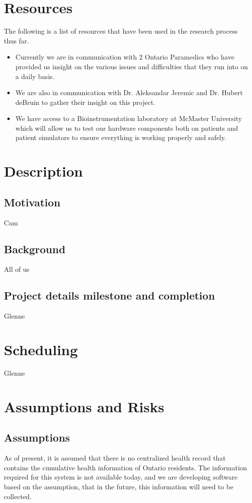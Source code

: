 \documentclass{article}
\begin{document}
\section{Resources}
The following is a list of resources that have been used in the research process thus far.
\begin{itemize}
\item Currently we are in communication with 2 Ontario Paramedics who have provided us insight on the various issues and difficulties that they run into on a daily basis.
\item We are also in communication with Dr. Aleksandar Jeremic and Dr. Hubert deBruin to gather their insight on this project.
\item We have access to a Bioinstrumentation laboratory at McMaster University which will allow us to test our hardware components both on patients and patient simulators to ensure everything is working properly and safely.
\end{itemize}



\section{Description}

\subsection{Motivation}
Cam
\subsection{Background}
All of us
\subsection{Project details milestone and completion}
Glenne
\section{Scheduling}
Glenne
\section{Assumptions and Risks}

\subsection{Assumptions}

As of present, it is assumed that there is no centralized health record that contains the cumulative health information of Ontario residents. The information required for this system is not available today, and we are developing software based on the assumption, that in the future, this information will need to be collected.
\end{document}
